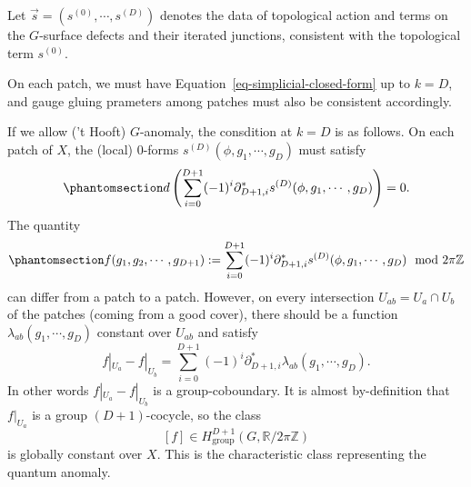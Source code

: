 \documentclass[11pt,toc=bibliography]{scrbook}
\numberwithin{equation}{section}
\begin{document}
\begin{tcolorbox}[enhanced jigsaw, opacityback=0, opacitybacktitle=0.6, leftrule=.75mm, arc=.35mm, coltitle=black, breakable, colframe=quarto-callout-important-color-frame, titlerule=0mm, colback=white, bottomrule=.15mm, left=2mm, colbacktitle=quarto-callout-important-color!10!white, toptitle=1mm, bottomtitle=1mm, title=\textcolor{quarto-callout-important-color}{\faExclamation}\hspace{0.5em}{\(G\)-anomaly from a Topological Term}, rightrule=.15mm, toprule=.15mm]

Let \(\vec{s} = (s^{(0)},\cdots,s^{(D)})\) denotes the data of
topological action and terms on the \(G\)-surface defects and their
iterated junctions, consistent with the topological term \(s^{(0)}\).

On each patch, we must have Equation~\ref{eq-simplicial-closed-form} up
to \(k=D\), and gauge gluing prameters among patches must also be
consistent accordingly.

If we allow ('t Hooft) \(G\)-anomaly, the consdition at \(k=D\) is as
follows. On each patch of \(X\), the (local) 0-forms
\(s^{(D)}(\phi,g_1,\cdots,g_D)\) must satisfy
\begin{equation}\phantomsection\label{eq-sD-consistensy}{
d\left(\sum_{i=0}^{D+1} (-1)^{i} \partial_{D+1,i}^* s^{(D)}(\phi,g_1,\cdots,g_D)\right) = 0.
}\end{equation} The quantity
\begin{equation}\phantomsection\label{eq-anomaly-differential}{
f(g_1,g_2,\cdots,g_{D+1}) := \sum_{i=0}^{D+1} (-1)^{i} \partial_{D+1,i}^* s^{(D)}(\phi,g_1,\cdots,g_D) \mod 2\pi\mathbb{Z}
}\end{equation} can differ from a patch to a patch. However, on every
intersection \(U_{ab} = U_a\cap U_b\) of the patches (coming from a good
cover), there should be a function \(\lambda_{ab}(g_1,\cdots,g_D)\)
constant over \(U_{ab}\) and satisfy \[
f|_{U_a} - f|_{U_b} = \sum_{i=0}^{D+1} (-1)^{i} \partial_{D+1,i}^* \lambda_{ab}(g_1,\cdots,g_D).
\] In other words \(f|_{U_a} - f|_{U_b}\) is a group-coboundary. It is
almost by-definition that \(f|_{U_a}\) is a group \((D+1)\)-cocycle, so
the class \[
[f] \in H^{D+1}_\text{group}(G,\mathbb{R}/2\pi\mathbb{Z})
\] is globally constant over \(X\). This is the characteristic class
representing the quantum anomaly.

\end{tcolorbox}
\end{document}
